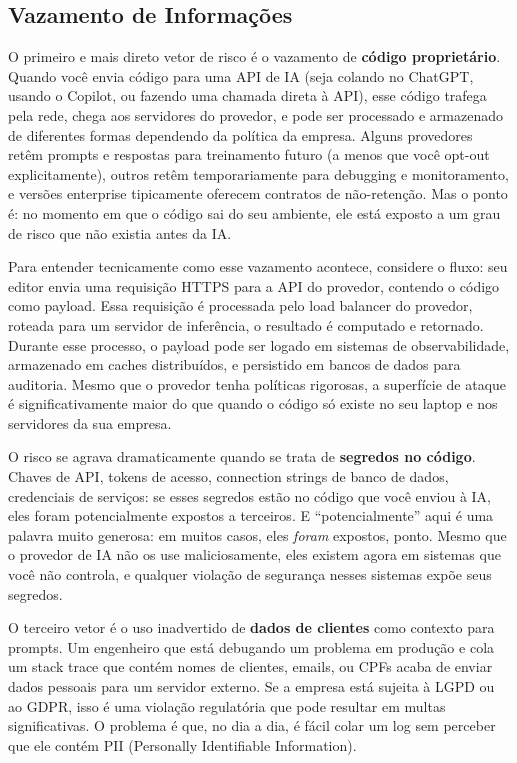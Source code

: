 \subsection{Vazamento de Informações}

O primeiro e mais direto vetor de risco é o vazamento de \textbf{código proprietário}.
Quando você envia código para uma API de IA (seja colando no ChatGPT, usando o
Copilot, ou fazendo uma chamada direta à API), esse código trafega pela rede,
chega aos servidores do provedor, e pode ser processado e armazenado de diferentes
formas dependendo da política da empresa. Alguns provedores retêm prompts e respostas
para treinamento futuro (a menos que você opt-out explicitamente), outros retêm
temporariamente para debugging e monitoramento, e versões enterprise tipicamente
oferecem contratos de não-retenção. Mas o ponto é: no momento em que o
código sai do seu ambiente, ele está exposto a um grau de risco que não existia
antes da IA.

Para entender tecnicamente como esse vazamento acontece, considere o fluxo: seu editor
envia uma requisição HTTPS para a API do provedor, contendo o código como payload.
Essa requisição é processada pelo load balancer do provedor, roteada para um servidor
de inferência, o resultado é computado e retornado. Durante esse processo, o payload
pode ser logado em sistemas de observabilidade, armazenado em caches distribuídos,
e persistido em bancos de dados para auditoria. Mesmo que o provedor tenha políticas
rigorosas, a superfície de ataque é significativamente maior do que quando o código
só existe no seu laptop e nos servidores da sua empresa.

O risco se agrava dramaticamente quando se trata de \textbf{segredos no código}.
Chaves de API, tokens de acesso, connection strings de banco de dados, credenciais
de serviços: se esses segredos estão no código que você enviou à IA, eles foram
potencialmente expostos a terceiros. E ``potencialmente'' aqui é uma palavra muito
generosa: em muitos casos, eles \textit{foram} expostos, ponto. Mesmo que o provedor
de IA não os use maliciosamente, eles existem agora em sistemas que você não controla,
e qualquer violação de segurança nesses sistemas expõe seus segredos.

O terceiro vetor é o uso inadvertido de \textbf{dados de clientes} como contexto para
prompts. Um engenheiro que está debugando um problema em produção e cola um stack trace
que contém nomes de clientes, emails, ou CPFs acaba de enviar dados pessoais para um
servidor externo. Se a empresa está sujeita à LGPD ou ao GDPR, isso é uma violação
regulatória que pode resultar em multas significativas. O problema é que, no dia a dia,
é fácil colar um log sem perceber que ele contém PII (Personally
Identifiable Information).


